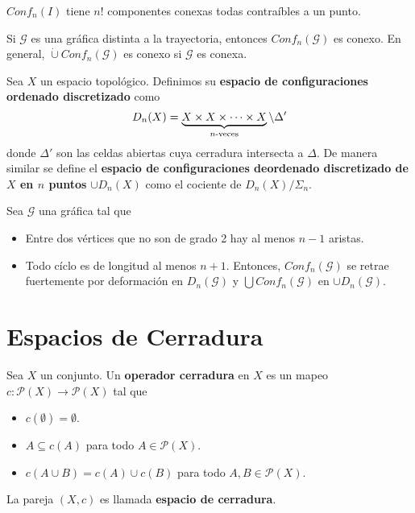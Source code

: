 \documentclass[12pt]{report}
\theoremstyle{largebreak}
\newcommand\cf[3]{\ensuremath{#1:#2\rightarrow#3}}
\begin{document}
    \begin{theor}
        $Conf_n(I)$ tiene $n!$ componentes conexas todas contraíbles a un punto.
    \end{theor}

    Si $\mathcal{G}$ es una gráfica distinta a la trayectoria, entonces $Conf_n(\mathcal{G})$ es conexo. En general, $\dot{\cup}Conf_n(\mathcal{G})$ es conexo si $\mathcal{G}$ es conexa.

    \begin{mydef}
        Sea $X$ un espacio topológico. Definimos su \textbf{espacio de configuraciones ordenado discretizado} como
        \begin{equation*}
            D_n(X)=\underbrace{X\times X\times\cdots\times X}_{ n\textup{-veces}}\backslash\Delta'
        \end{equation*}
        donde $\Delta'$ son las celdas abiertas cuya cerradura intersecta a $\Delta$. De manera similar se define el \textbf{espacio de configuraciones deordenado discretizado de $X$ en $n$ puntos} $\cup D_n(X)$ como el cociente de $D_n(X)/\Sigma_n$.
    \end{mydef}

    \begin{theor}
        Sea $\mathcal{G}$ una gráfica tal que
        \begin{itemize}
            \item Entre dos vértices que no son de grado 2 hay al menos $n-1$ aristas.
            \item Todo cíclo es de longitud al menos $n+1$.
            Entonces, $Conf_n(\mathcal{G})$ se retrae fuertemente por deformación en $D_n(\mathcal{G})$ y $\bigcup Conf_n(\mathcal{G})$ en $\cup D_n(\mathcal{G})$.
        \end{itemize}
    \end{theor}

    \section{Espacios de Cerradura}



    \begin{mydef}
        Sea $X$ un conjunto. Un \textbf{operador cerradura} en $X$ es un mapeo $\cf{c}{\mathcal{P}(X)}{\mathcal{P}(X)}$ tal que
        \begin{itemize}
            \item $c(\emptyset)=\emptyset$.
            \item $A\subseteq c(A)$ para todo $A\in\mathcal{P}(X)$.
            \item $c(A\cup B)=c(A)\cup c(B)$ para todo $A,B\in\mathcal{P}(X)$.
        \end{itemize}
        La pareja $(X,c)$ es llamada \textbf{espacio de cerradura}.
    \end{mydef}
\end{document}
